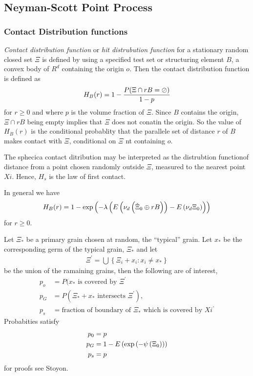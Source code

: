 \subsection{Neyman-Scott Point Process}


\subsubsection{Contact Distribution functions}
{\em Contact distribution function} or {\em hit distrubution function}
for a stationary random closed set $\Xi$ is defined by using a specified test set or structuring element $B$,
a convex body of $R^d$ containing the origin $o$.
Then the contact distribution function is defined as
\begin{align}
  H_B(r) = 1 - \frac{P(\Xi\cap rB = \oslash)}{1-p}
\end{align}
for $r\ge 0$ and where $p$ is the volume fraction of $\Xi$.
Since $B$ contains the origin, $\Xi\cap rB$ being empty implies that $\Xi$ does not conatin the origin. So the value of $H_B(r)$ is the conditional probablity that the parallele set of distance $r$ of $B$ makes contact with $\Xi$, conditional on $\Xi$ nt containing $o$.

The sphecica contact ditribution may be interpreted as the distrubtion functionof distance from a point chosen randomly outside $\Xi$,
measured to the nearest point $Xi$.  Hence, $H_s$ is the law of first contact.

In general we have
\begin{align}
  H_B(r) = 1- \exp\left( -\lambda\left( E\left( \nu_d \left( \check \Xi_0 \oplus r B \right) \right)- E\left( \nu_d{\Xi_0} \right) \right) \right)
\end{align}
for $r\ge 0$.

 Let $\Xi_\ast$ be a primary grain chosen at random, the ``typical'' grain.
 Let $x_\ast$ be the corresponding germ of the typical grain, $\Xi_\ast$ and let
 \begin{align}
   \Xi^\prime = \bigcup\left\{\Xi_i + x_i : x_i \ne x_\ast \right\}
 \end{align}
 be the union of the ramaining grains, then the following are of interest,
 \begin{align}
   p_o &= P(x_\ast \text{ is covered by $\Xi^\prime$}\\
   p_G &= P(\Xi_\ast + x_\ast \text{ intersects $\Xi^\prime$}),\\
   p_s &= \text{fraction of boundary of $\Xi_\ast$ which is covered by $Xi^\prime$}
 \end{align}
 Probabities satisfy
 \begin{align}
   p_0 &= p\\
   p_G &= 1 - E\left( \exp\left( -\psi\left( \Xi_0 \right) \right) \right)\\
   p_s &= p
 \end{align}
 for proofs see Stoyon.

